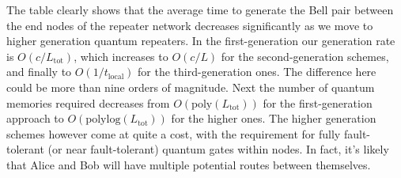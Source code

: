 The table clearly shows that the average time to generate the Bell pair between the end nodes of the repeater network decreases significantly as we move to higher generation quantum repeaters. In the first-generation our generation rate is $O(c/L_\mathrm{tot})$, which increases to $O(c/L)$ for the second-generation schemes, and finally to $O(1/t_\mathrm{local})$ for the third-generation ones. The difference here could be more than nine orders of magnitude. Next the number of quantum memories required decreases from $O(\mathrm{poly}(L_\mathrm{tot}))$ for the first-generation approach to $O(\mathrm{polylog}(L_\mathrm{tot}))$ for the higher ones. The higher generation schemes however come at quite a cost, with the requirement for fully fault-tolerant (or near fault-tolerant) quantum gates within nodes. In fact, it's likely that Alice and Bob will have multiple potential routes between themselves.





